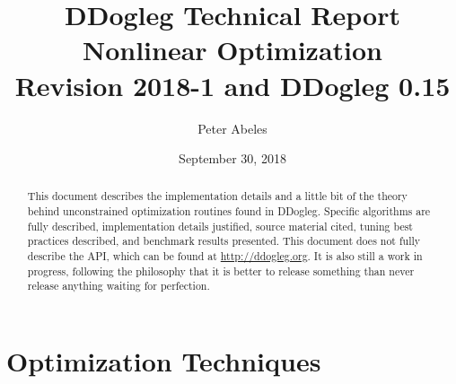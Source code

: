 \documentclass[peerreview,compsoc,onecolumn]{IEEEtran}
\begin{document}
\title{DDogleg Technical Report\\ Nonlinear Optimization\\{\Large Revision 2018-1 and DDogleg 0.15}}


\author{Peter Abeles}
\date{September 30, 2018}

\maketitle
\tableofcontents
\listoffigures
\listoftables

\IEEEpeerreviewmaketitle
\begin{abstract}
This document describes the implementation details and a little bit of the theory behind unconstrained optimization routines found in DDogleg. Specific algorithms are fully described, implementation details justified, source material cited, tuning best practices described, and benchmark results presented. This document does not fully describe the API, which can be found at \url{http://ddogleg.org}. It is also still a work in progress, following the philosophy that it is better to release something than never release anything waiting for perfection.
\end{abstract}


\section{Optimization Techniques}
\end{document}
